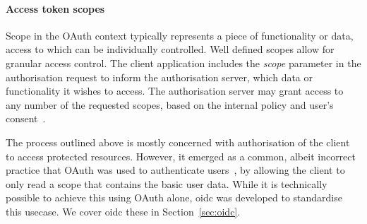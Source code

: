 \paragraph{Access token scopes}
Scope in the OAuth context typically represents a piece of functionality or data, access to which can be individually controlled. Well defined scopes allow for granular access control. The client application includes the \textit{scope} parameter in the authorisation request to inform the authorisation server, which data or functionality it wishes to access. The authorisation server may grant access to any number of the requested scopes, based on the internal policy and user's consent~\cite{Hardt2012TheFramework}.

The process outlined above is mostly concerned with authorisation of the client to access protected resources. However, it emerged as a common, albeit incorrect practice that OAuth was used to authenticate users~\cite{RicherUser2.0}, by allowing the client to only read a scope that contains the basic user data. While it is technically possible to achieve this using OAuth alone, \acrshort{oidc} was developed to standardise this usecase. We cover \acrshort{oidc} these in Section~\ref{sec:oidc}.